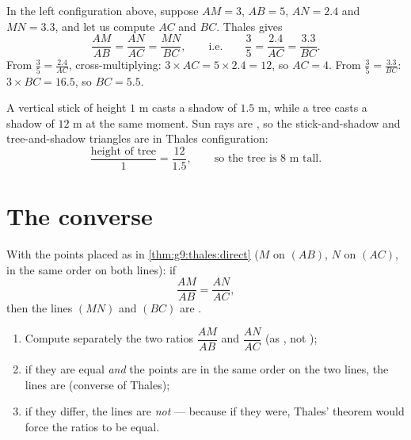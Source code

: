 \begin{example}\label{ex:g9:thales:compute}
In the left configuration above, suppose $AM = 3$, $AB = 5$, $AN = 2.4$
and $MN = 3.3$, and let us compute $AC$ and $BC$. Thales gives
\[
\frac{AM}{AB} = \frac{AN}{AC} = \frac{MN}{BC},
\qquad\text{i.e.}\qquad
\frac35 = \frac{2.4}{AC} = \frac{3.3}{BC}.
\]
From $\frac35 = \frac{2.4}{AC}$, cross-multiplying:
$3 \times AC = 5 \times 2.4 = 12$, so $AC = 4$. From
$\frac35 = \frac{3.3}{BC}$: $3 \times BC = 16.5$, so $BC = 5.5$.
\end{example}

\begin{example}\label{ex:g9:thales:stick}
A vertical stick of height $1$ m casts a shadow of $1.5$ m, while a tree
casts a shadow of $12$ m at the same moment. Sun rays are , so
the stick-and-shadow and tree-and-shadow triangles are in Thales
configuration:
\[
\frac{\text{height of tree}}{1} = \frac{12}{1.5},
\qquad\text{so the tree is } 8 \text{ m tall.}
\]
\end{example}

\section{The converse}

\begin{theorem}\label{thm:g9:thales:converse}
With the points placed as in \cref{thm:g9:thales:direct} ($M$ on $(AB)$,
$N$ on $(AC)$, in the same order on both lines):
if
\[
\frac{AM}{AB} = \frac{AN}{AC},
\]
then the lines $(MN)$ and $(BC)$ are .
\end{theorem}
\admitted

\begin{method}\label{met:g9:thales:converse}
\begin{enumerate}
  \item Compute separately the two ratios $\dfrac{AM}{AB}$ and
        $\dfrac{AN}{AC}$ (as , not );
  \item if they are equal \emph{and} the points are in the same order on
        the two lines, the lines are  (converse of Thales);
  \item if they differ, the lines are \emph{not}  --- because if
        they were, Thales' theorem would force the ratios to be equal.
\end{enumerate}
\end{method}

